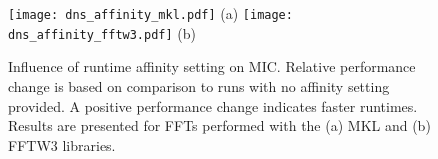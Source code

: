 \begin{figure}
\begin{center}
\texttt{[image: dns\_affinity\_mkl.pdf]}
(a)
\texttt{[image: dns\_affinity\_fftw3.pdf]}
(b)
\end{center}
\vspace*{-.5cm}
\caption{Influence of runtime affinity setting on MIC.
  Relative performance change is based
  on comparison to runs with no affinity setting provided. A
  positive performance change indicates faster runtimes.  Results are
  presented for FFTs performed with the (a) MKL and (b) FFTW3
  libraries.}
\label{fig:dns_affinity}
\end{figure}




%

%
